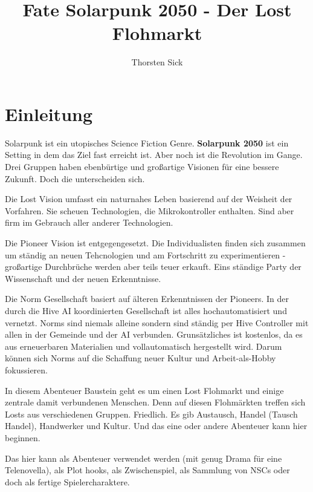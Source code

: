\documentclass{book}
\title{Fate Solarpunk 2050 - Der Lost Flohmarkt}
\author{Thorsten Sick}
\begin{document}
%
%
\mbox{}
\thispagestyle{empty}
\BgThispage



%

\chapter{Einleitung}

Solarpunk ist ein utopisches Science Fiction Genre. \textbf{Solarpunk 2050} ist ein Setting in dem das Ziel fast erreicht ist. Aber noch ist die Revolution im Gange. Drei Gruppen haben ebenbürtige und großartige Visionen für eine bessere Zukunft. Doch die unterscheiden sich.

Die Lost Vision umfasst ein naturnahes Leben basierend auf der Weisheit der Vorfahren. Sie scheuen Technologien, die Mikrokontroller enthalten. Sind aber firm im Gebrauch aller anderer Technologien.

Die Pioneer Vision ist entgegengesetzt. Die Individualisten finden sich zusammen um ständig an neuen Tehcnologien und am Fortschritt zu experimentieren - großartige Durchbrüche werden aber teils teuer erkauft. Eins ständige Party der Wissenschaft und der neuen Erkenntnisse.

Die Norm Gesellschaft basiert auf älteren Erkenntnissen der Pioneers. In der durch die Hive AI koordinierten Gesellschaft ist alles hochautomatisiert und vernetzt. Norms sind niemals alleine sondern sind ständig per Hive Controller mit allen in der Gemeinde und der AI verbunden. Grunsätzliches ist kostenlos, da es aus erneuerbaren Materialien und vollautomatisch hergestellt wird. Darum können sich Norms auf die Schaffung neuer Kultur und Arbeit-als-Hobby fokussieren.

In diesem Abenteuer Baustein geht es um einen Lost Flohmarkt und einige zentrale damit verbundenen Menschen. Denn auf diesen Flohmärkten treffen sich Losts aus verschiedenen Gruppen. Friedlich. Es gib Austausch, Handel (Tausch Handel), Handwerker und Kultur. Und das eine oder andere Abenteuer kann hier beginnen.

Das hier kann als Abenteuer verwendet werden (mit genug Drama für eine Telenovella), als Plot hooks, als Zwischenspiel, als Sammlung von NSCs oder doch als fertige Spielercharaktere.






\end{document}
